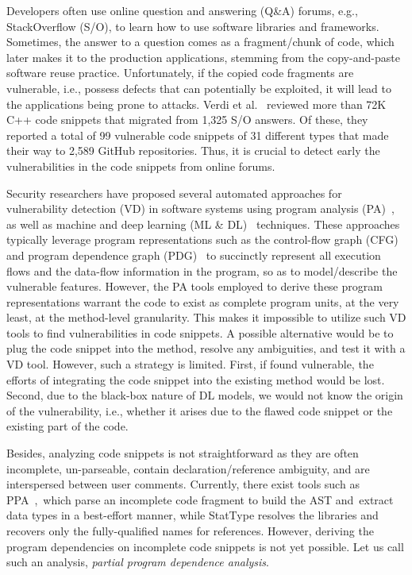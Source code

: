 Developers often use online question and answering (Q\&A) forums, e.g., StackOverflow (S/O), to learn how to use software libraries and frameworks. Sometimes, the answer to a question comes as a fragment/chunk of code, which later makes it to the production applications, stemming from the copy-and-paste software reuse practice. Unfortunately, if the copied code fragments are vulnerable, i.e., possess defects that can potentially be exploited, it will lead to the applications being prone to attacks. Verdi et al.~\cite{verdi-tse22} reviewed more than 72K C++ code snippets that migrated from 1,325 S/O answers. Of these, they reported a total of 99 vulnerable code snippets of 31 different types that made their way to 2,589 GitHub repositories. Thus, it is crucial to detect early the vulnerabilities in the code snippets from online forums.


Security researchers have proposed several automated approaches for vulnerability detection (VD) in software systems using program analysis (PA)~\cite{FlawFinder,RATS,viega2000its4,Checkmarx,HPFortify,Coverity}, as well as machine and deep learning (ML \& DL)~\cite{fse21,chakraborty2020deep,zhou2019devign,li2018sysevr,li2018vuldeepecker} techniques. These approaches typically leverage program representations such as the control-flow graph (CFG)~\cite{fse21} and program dependence graph (PDG)~\cite{fse21} to succinctly represent all execution flows and the data-flow information in the program, so as to model/describe the vulnerable features. However, the PA tools employed to derive these program representations warrant the code to exist as complete program units, at the very least, at the method-level granularity. This makes it impossible to utilize such VD tools to find vulnerabilities in code snippets. A possible alternative would be to plug the code snippet into the method, resolve any ambiguities, and test it with a VD tool. However, such a strategy is limited. First, if found vulnerable, the efforts of integrating the code snippet into the existing method would be lost. Second, due to the black-box nature of DL models, we would not know the origin of the vulnerability, i.e., whether it arises due to the flawed code snippet or the existing part of the code.

Besides, analyzing code snippets is not straightforward as they are often incomplete, un-parseable, contain declaration/reference ambiguity, and are interspersed between user comments. Currently, there exist tools such as PPA~\cite{ppa08},~which parse an incomplete code fragment to build the AST and~ex\-tract data types in a best-effort manner, while StatType \cite{icse18} resolves the libraries and recovers only the fully-qualified names for references. However, deriving the program dependencies on incomplete code snippets is not yet possible. Let us call such an analysis, {\em partial program dependence analysis}.

